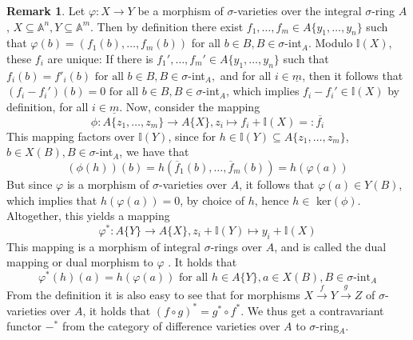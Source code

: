 \documentclass{article}
\def\I{\mathbb{I}}
\def\s{\sigma}
\def\fa{\text{ for all }}
\theoremstyle{plain}
\theoremstyle{definition}
\newtheorem{rem}[Satz]{Remark}
\begin{document}
\begin{rem}\label{dualmor}
Let $\varphi: X \rightarrow Y$ be a morphism of $\s$-varieties over the integral $\s$-ring $A$, $X \subseteq \mathbb{A}^n, Y \subseteq \mathbb{A}^m$. Then by definition there exist $f_1, \ldots, f_m \in A\{y_1,\ldots,y_n\}$ such 
that $\varphi(b) = (f_1(b),\ldots,f_m(b))$ for all $b \in B, B \in \s$-int$_A$. Modulo $\I(X)$, these $f_i$ are unique:
 If there is $f_1', \ldots, f_m' \in A\{y_1,\ldots,y_n\}$ such that $f_i(b) = f'_i(b) \fa b \in B, B \in \s$-int$_A,$ and for all $i \in \underline{m}$,
then it follows that $(f_i - f_i')(b) = 0 \fa b \in B, B \in \s$-int$_A$, which implies $f_i - f_i' \in \I(X)$ by definition, for all $i \in \underline{m}$.
Now, consider the mapping \[ \phi: A\{z_1,\ldots,z_m \} \rightarrow A\{X\}, z_i \mapsto f_i + \I(X) =: \overline{f_i} \]
This mapping factors over $\I(Y)$, since for $h \in \I(Y) \subseteq A\{z_1,\ldots,z_m\}$, $b \in X(B), B \in \s$-int$_A$, we have that 
\[ (\phi(h))(b) = h(\overline f_1(b), \ldots, \overline f_m(b)) = h(\varphi(a)) \]
But since $\varphi$ is a morphism of $\s$-varieties over $A$, it follows that $\varphi(a) \in Y(B)$, which implies that $h(\varphi(a)) = 0$, by choice of $h$, hence $h \in $ ker$(\phi)$.
Altogether, this yields a mapping 
\[ \varphi^* : A\{Y\} \rightarrow A\{X\}, z_i + \I(Y) \mapsto y_i + \I(X) \]
This mapping is a morphism of integral $\s$-rings over $A$, and is called the dual mapping or dual morphism to $\varphi$ . It holds that
\[ \varphi^*(h)(a) = h(\varphi(a)) \fa h \in A\{Y\}, a \in X(B), B \in \s\text{-int}_A \]
From the definition it is also easy to see that for morphisms $X \xrightarrow{f} Y \xrightarrow{g} Z$ of $\s$-varieties over $A$, it holds that $ (f \circ g)^* = g^* \circ f^*$. 
We thus get a contravariant functor $-^*$ from the category of difference varieties over $A$ to $\s$-ring$_A$.
\end{rem}
\end{document}
